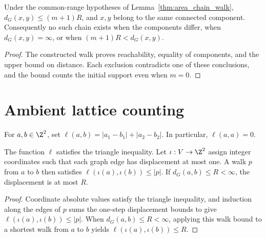 \begin{lemma}
    \label{thm:area_chain_components}
    \leanok
    Under the common-range hypotheses of Lemma~\ref{thm:area_chain_walk},
    $d_G(x,y)\le(m+1)R$, and $x,y$ belong to the same connected component.
    Consequently no such chain exists when the components differ,
    when $d_G(x,y)=\infty$, or when $(m+1)R<d_G(x,y)$.
\end{lemma}
\begin{proof}
    \leanok
    The constructed walk proves reachability, equality of components, and
    the upper bound on distance. Each exclusion contradicts one of these
    conclusions, and the bound counts the initial support even when $m=0$.
\end{proof}

\section{Ambient lattice counting}

\begin{definition}
    \label{def:area_lattice_displacement}
    \leanok
    For $a,b\in\Z^2$, set
    $\ell(a,b)=|a_1-b_1|+|a_2-b_2|$. In particular, $\ell(a,a)=0$.
\end{definition}

\begin{lemma}
    \label{thm:area_walk_displacement}
    \leanok
    The function $\ell$ satisfies the triangle inequality. Let
    $\iota:V\to\Z^2$ assign integer coordinates such that each graph edge
    has displacement at most one. A walk $p$ from $a$ to $b$ then satisfies
    $\ell(\iota(a),\iota(b))\le |p|$. If $d_G(a,b)\le R<\infty$, the
    displacement is at most $R$.
\end{lemma}
\begin{proof}
    \leanok
    Coordinate absolute values satisfy the triangle inequality, and
    induction along the edges of $p$ sums the one-step displacement
    bounds to give $\ell(\iota(a),\iota(b))\le |p|$. When
    $d_G(a,b)\le R<\infty$, applying this walk bound to a shortest walk
    from $a$ to $b$ yields $\ell(\iota(a),\iota(b))\le R$.
\end{proof}

